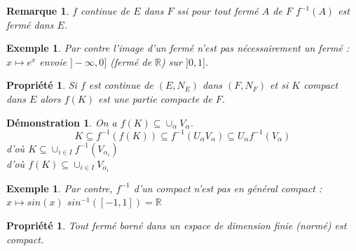 \documentclass[a4paper, oneside]{report}
\theoremstyle{break}
\newtheorem{propr}[thm]{Propriété}
\newtheorem{exem}[thm]{Exemple}
\newtheorem*{demo}{Démonstration}
\newtheorem{remar}[thm]{Remarque}
\newcommand{\R}{\mathbb{R}}
\begin{document}
\begin{remar}
$f$ continue de $E$ dans $F$ ssi pour tout fermé $A$ de $F$ $f^{-1}(A)$ est fermé dans $E$.
\end{remar}


\begin{exem}
Par contre l'image d'un fermé n'est pas nécessairement un fermé : $x\mapsto e^x$ envoie $]-\infty,0]$ (fermé de $\R$) sur $]0,1]$.

\end{exem}

\begin{propr}
Si $f$ est continue de $(E, N_E)$ dans $(F, N_F)$ et si $K$ compact dans $E$ alors $f(K)$ est une partie compacte de $F$.
\end{propr}

\begin{demo}
On a $f(K)\subseteq \cup_\alpha V_\alpha$.
$$K\subseteq f^{-1}(f(K)) \subseteq f^{-1}(U_\alpha V_\alpha)\subseteq U_\alpha f^{-1}(V_\alpha)$$
d'où $K\subseteq \cup_{i\in I} f^{-1}(V_{\alpha_i})$\\
d'où $f(K)\subseteq \cup_{i\in I} V_{\alpha_i}$
\end{demo}


\begin{exem}
Par contre, $f^{-1}$ d'un compact n'est pas en général compact : $x\mapsto sin(x)$ $sin^{-1}([-1,1])=\R$

\end{exem}

\begin{propr}
Tout fermé borné dans un espace de dimension finie (normé) est compact.
\end{propr}
\end{document}
